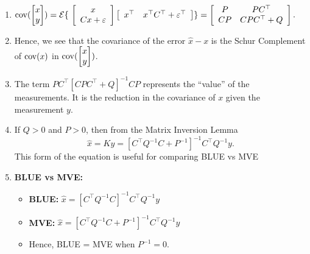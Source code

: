 \begin{rem} \mbox{ }

\begin{enumerate}
\item $\mathrm{cov}(\begin{bmatrix} x \\ y \end{bmatrix}) = \mathcal{E}\{\ \left[\begin{array}{c} x \\ Cx + \varepsilon  \end{array} \right] \left[\begin{array}{cc} x^\top & x^\top C^\top + \varepsilon^\top \end{array} \right] \} = \left[\begin{array}{cc} P & P C^\top \\ C P & CPC^\top + Q \end{array} \right].$

\item Hence, we see that the covariance of the error $\widehat{x}-x$ is the Schur Complement of $\mathrm{cov}(x)$  in  $\mathrm{cov}(\begin{bmatrix} x \\ y \end{bmatrix})$. 

\item The term $PC^\top [CPC^\top +Q]^{-1}CP$ represents the ``value'' of the measurements. It is the reduction in the covariance of $x$ given the measurement $y$.

\item If $Q>0$ and $P>0$, then from the Matrix Inversion Lemma
$$\boxed{\widehat x = Ky = [C^\top Q^{-1}C+P^{-1}]^{-1}C^\top Q^{-1}y.}$$
This form of the equation is useful for comparing BLUE vs MVE

\item \textbf{BLUE vs MVE:}\\

\begin{itemize}

\item \textbf{BLUE:} $\widehat x = [C^\top  Q^{-1}C]^{-1}C^\top  Q^{-1}y$ \\

\item \textbf{MVE:} $\widehat x = [C^\top  Q^{-1}C+P^{-1}]^{-1}C^\top  Q^{-1}y$ \\

\item Hence, BLUE = MVE when $P^{-1} = 0$.\\


\end{itemize}
\end{enumerate}
\end{rem}
